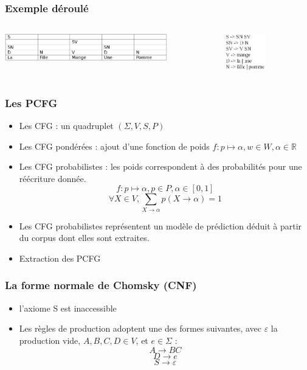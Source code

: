 \documentclass[table]{beamer}
\begin{document}
\begin{frame}
\frametitle{Exemple déroulé}
  \begin{columns}
  \begin{column}{0.6\textwidth}
     \includegraphics[width=200pt,]{10.jpeg}  
  \end{column}
  \begin{column}{0.5\textwidth}
  \includegraphics[width=50pt,]{11.jpeg}  
  \end{column}
  \end{columns}
\end{frame}


\begin{frame}
 \frametitle{Les PCFG}
 \begin{itemize}
  \item<1-5>{Les CFG : un quadruplet $(\Sigma,V,S,P)$ }
  \item<2-5>{Les CFG pondérées : ajout d'une fonction de poids $ f : p \mapsto \alpha, w \in W, \alpha \in \mathbb{R} $ }
  \item<3-5>{Les CFG probabilistes : les poids correspondent à des probabilités pour une réécriture donnée.  
  $$ f : p \mapsto \alpha, p \in P, \alpha \in [0,1]$$ $$ \forall X \in V, \sum_{X\to\alpha}p(X\to\alpha)=1 $$ }
  \item<4-5>{Les CFG probabilistes représentent un modèle de prédiction déduit à partir du corpus dont elles sont extraites.}
  \item<5-5>{Extraction des PCFG}
 \end{itemize}

\end{frame}



\begin{frame} 
\frametitle{La forme normale de Chomsky (CNF)}
 \begin{itemize}
 \item {l'axiome S est inaccessible}
 \item {Les règles de production adoptent une des formes suivantes, avec  $\varepsilon$ la production vide, $A,B,C,D \in V$, et $e \in \Sigma$ : 
     $$A \rightarrow B C $$ 
     $$ D \rightarrow e $$
     $$ S \rightarrow \varepsilon$$ }

 \end{itemize}

\end{frame}
\end{document}
